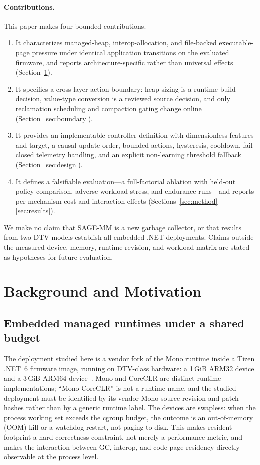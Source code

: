 \documentclass[acmsmall,screen]{acmart}
\begin{document}
\paragraph{Contributions.}
This paper makes four bounded contributions.
\begin{enumerate}
  \item It characterizes managed-heap, interop-allocation, and file-backed
  executable-page pressure under identical application transitions on the
  evaluated firmware, and reports architecture-specific rather than
  universal effects (Section~\ref{sec:motivation}).
  \item It specifies a cross-layer action boundary: heap sizing is a
  runtime-build decision, value-type conversion is a reviewed source
  decision, and only reclamation scheduling and compaction gating change
  online (Section~\ref{sec:boundary}).
  \item It provides an implementable controller definition with
  dimensionless features and target, a causal update order, bounded
  actions, hysteresis, cooldown, fail-closed telemetry handling, and an
  explicit non-learning threshold fallback (Section~\ref{sec:design}).
  \item It defines a falsifiable evaluation---a full-factorial ablation
  with held-out policy comparison, adverse-workload stress, and endurance
  runs---and reports per-mechanism cost and interaction effects
  (Sections~\ref{sec:method}--\ref{sec:results}).
\end{enumerate}

We make no claim that SAGE-MM is a new garbage collector, or that results
from two DTV models establish all embedded .NET deployments. Claims outside
the measured device, memory, runtime revision, and workload matrix are
stated as hypotheses for future evaluation.

\section{Background and Motivation}
\label{sec:motivation}

\subsection{Embedded managed runtimes under a shared budget}
The deployment studied here is a vendor fork of the Mono runtime inside a
Tizen .NET~6 firmware image, running on DTV-class hardware: a 1\,GiB ARM32
device and a 3\,GiB ARM64 device~\cite{monoruntime}. Mono and CoreCLR are
distinct runtime
implementations; ``Mono CoreCLR'' is not a runtime name, and the studied
deployment must be identified by its vendor Mono source revision and patch
hashes rather than by a generic runtime label. The devices are swapless:
when the process working set exceeds the cgroup budget, the outcome is an
out-of-memory (OOM) kill or a watchdog restart, not paging to disk. This
makes resident footprint a hard correctness constraint, not merely a
performance metric, and makes the interaction between GC, interop, and
code-page residency directly observable at the process level.
\end{document}
